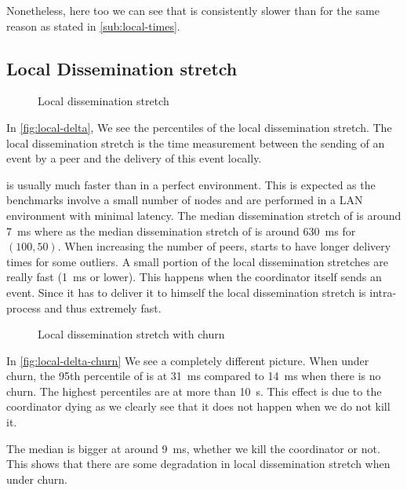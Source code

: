 Nonetheless, here too we can see that \epto is consistently slower than \jgroups for the same reason as stated in \autoref{sub:local-times}.
\subsection{Local Dissemination stretch}
\begin{figure}[hpt]
	\centering
	
	\vspace{-2mm} 
	\caption{Local dissemination stretch}
	\vspace{-2mm}
	\label{fig:local-delta}  
\end{figure}
In \autoref{fig:local-delta}, We see the percentiles of the local dissemination stretch. The local dissemination stretch is the time measurement between the sending of an event by a peer and the delivery of this event locally.
\par
\jgroups is usually much faster than \epto in a perfect environment. This is expected as the benchmarks involve a small number of nodes and are performed in a LAN environment with minimal latency. The median dissemination stretch of \jgroups is around \SI{7}{\milli\second} where as the median dissemination stretch of \epto is around \SI{630}{\milli\second} for $(100,50)$. When increasing the number of peers, \jgroups starts to have longer delivery times for some outliers. A small portion of the local dissemination stretches are really fast (\SI{1}{\milli\second} or lower). This happens when the coordinator itself sends an event. Since it has to deliver it to himself the local dissemination stretch is intra-process and thus extremely fast.

\begin{figure}[hpt]
	\centering
	
	\vspace{-2mm} 
	\caption{Local dissemination stretch with churn}
	\vspace{-2mm}
	\label{fig:local-delta-churn}   
\end{figure}
In \autoref{fig:local-delta-churn} We see a completely different picture. When under churn, the 95th percentile of \jgroups is at \SI{31}{\milli\second} compared to \SI{14}{\milli\second} when there is no churn. The highest percentiles are at more than \SI{10}{\second}. This effect is due to the coordinator dying as we clearly see that it does not happen when we do not kill it.

The median is bigger at around \SI{9}{\milli\second}, whether we kill the coordinator or not. This shows that there are some degradation in \jgroups local dissemination stretch when under churn.

